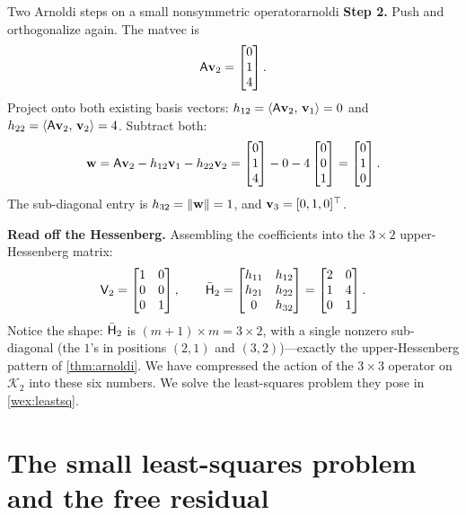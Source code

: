 \begin{workedexample}{Two Arnoldi steps on a small nonsymmetric operator}{arnoldi}
\textbf{Step 2.} Push and orthogonalize again. The matvec is
\[
  \mathsf{A}\mathbf{v}_2=\begin{bmatrix}0\\1\\4\end{bmatrix}.
\]
Project onto both existing basis vectors:
$h_{12}=\left\langle \mathsf{A}\mathbf{v}_2,\, \mathbf{v}_1\right\rangle=0$ and
$h_{22}=\left\langle \mathsf{A}\mathbf{v}_2,\, \mathbf{v}_2\right\rangle=4$. Subtract both:
\[
  \mathbf{w}=\mathsf{A}\mathbf{v}_2-h_{12}\mathbf{v}_1-h_{22}\mathbf{v}_2
     =\begin{bmatrix}0\\1\\4\end{bmatrix}-0-4\begin{bmatrix}0\\0\\1\end{bmatrix}
     =\begin{bmatrix}0\\1\\0\end{bmatrix}.
\]
The sub-diagonal entry is $h_{32}=\lVert\mathbf{w}\rVert=1$, and $\mathbf{v}_3=[0,1,0]^{\top}$.

\textbf{Read off the Hessenberg.} Assembling the coefficients into the
$3\times2$ upper-Hessenberg matrix:
\[
  \mathsf{V}_2=\begin{bmatrix}1&0\\0&0\\0&1\end{bmatrix},
  \qquad
  \bar{\mathsf{H}}_2=\begin{bmatrix} h_{11}&h_{12}\\ h_{21}&h_{22}\\ 0&h_{32}\end{bmatrix}
   =\begin{bmatrix} 2 & 0\\ 1 & 4\\ 0 & 1\end{bmatrix}.
\]
Notice the shape: $\bar{\mathsf{H}}_2$ is $(m{+}1)\times m=3\times2$, with a single
nonzero sub-diagonal (the $1$'s in positions $(2,1)$ and $(3,2)$)---exactly the
upper-Hessenberg pattern of \cref{thm:arnoldi}. We have compressed the action of the
$3\times3$ operator on $\mathcal{K}_2$ into these six numbers. We solve the
least-squares problem they pose in \cref{wex:leastsq}.
\end{workedexample}

\section{The small least-squares problem and the free residual}

